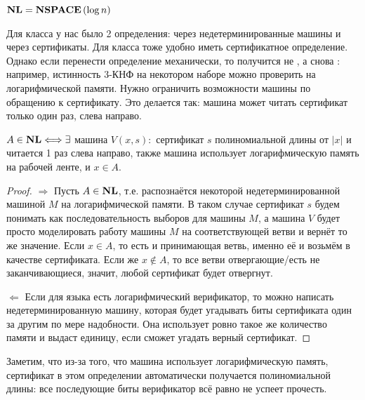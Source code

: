 \begin{definition}
    $\textbf{NL}=\textbf{NSPACE}\left({\log n}\right)$
\end{definition}

Для класса \np у нас было 2 определения: через недетерминированные машины и через сертификаты. Для класса \nlsp тоже удобно иметь сертификатное определение. Однако если перенести определение механически, то получится не \nlsp, а снова \np: например, истинность 3-КНФ на некотором наборе можно проверить на логарифмической памяти. Нужно ограничить возможности машины по обращению к сертификату. Это делается так: машина может читать сертификат только один раз, слева направо.

\begin{theorem} 
    $A \in \textbf{NL} \Longleftrightarrow \exists$ машина $V(x,s):$ сертификат $s$ полиномиальной длины от $|x|$ и читается 1 раз слева направо, также машина использует логарифмическую память на рабочей ленте, и $x \in A$.
\end{theorem}

\begin{proof}
    $\Rightarrow$ Пусть $A \in \textbf{NL}$, т.е. распознаётся некоторой недетерминированной машиной $M$ на логарифмической памяти. В таком случае сертификат $s$ будем понимать как последовательность выборов для машины  $M$, а машина $V$ будет просто моделировать работу машины $M$ на соответствующей ветви и вернёт то же значение. Если $x \in A$, то есть и принимающая ветвь, именно её и возьмём в качестве сертификата. Если же $x \not\in A$, то все ветви отвергающие/есть не заканчивающиеся, значит, любой сертификат будет отвергнут.
    
    $\Leftarrow$ Если для языка есть логарифмический верификатор, то можно написать недетерминированную машину, которая будет угадывать биты сертификата один за другим по мере надобности. Она использует ровно такое же количество памяти и выдаст единицу, если сможет угадать верный сертификат.
\end{proof}

\begin{lemmanote}
    Заметим, что из-за того, что машина использует логарифмическую память, сертификат в этом определении автоматически получается полиномиальной длины: все последующие биты верификатор всё равно не успеет прочесть.
\end{lemmanote}
